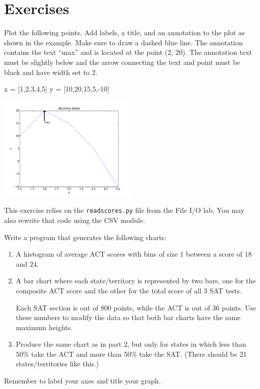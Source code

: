 \documentclass[11pt]{cselabheader}
\begin{document}
\newpage
\section{Exercises}
\begin{ex}[plotpoints.py]
Plot the following points. Add labels, a title, and an annotation to the plot
as shown in the example. Make sure to draw a dashed blue line.
The annotation contains the text ``max'' and is located at the point (2, 20).
The annotation text must be slightly below and the arrow connecting the text
and point must be black and have width set to 2.

\begin{python3code}
x = [1,2,3,4,5]
y = [10,20,15,5,-10]
\end{python3code}

\begin{center}
\includegraphics[width=0.5\textwidth]{img/basic.png}
\end{center}
\end{ex}

\begin{ex}[plotscores.py]
  This exercise relies on the \texttt{readscores.py} file from the File I/O
  lab. You may also rewrite that code using the CSV module.

  Write a program that generates the following charts:
  \begin{enumerate}
    \item A histogram of average ACT scores with bins of size $1$ between a
      score of $18$ and $24$.
    \item A bar chart where each state/territory is represented by two
      bars, one for the composite ACT score and the other for the total
      score of all 3 SAT tests.

      Each SAT section is out of 800 points, while the ACT is out of
      36 points.  Use these numbers to modify the data so that both bar
      charts have the same maximum heights.
    \item Produce the same chart as in part 2, but only for states in which
      less than 50\% take the ACT and more than 50\% take the SAT. (There
      should be 21 states/territories like this.)
  \end{enumerate}

  Remember to label your axes and title your graph.
\end{ex}
\end{document}
